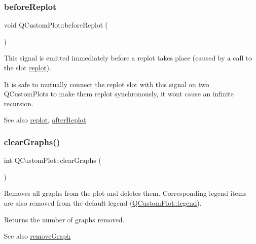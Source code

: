 \subsubsection{\texorpdfstring{before\+Replot}{beforeReplot}}
{\footnotesize\ttfamily void Q\+Custom\+Plot\+::before\+Replot (\begin{DoxyParamCaption}{ }\end{DoxyParamCaption})\hspace{0.3cm}{\ttfamily [signal]}}

This signal is emitted immediately before a replot takes place (caused by a call to the slot \hyperlink{class_q_custom_plot_aa4bfe7d70dbe67e81d877819b75ab9af}{replot}).

It is safe to mutually connect the replot slot with this signal on two Q\+Custom\+Plots to make them replot synchronously, it won\textquotesingle{}t cause an infinite recursion.

\begin{DoxySeeAlso}{See also}
\hyperlink{class_q_custom_plot_aa4bfe7d70dbe67e81d877819b75ab9af}{replot}, \hyperlink{class_q_custom_plot_a6f4fa624af060bc5919c5f266cf426a0}{after\+Replot} 
\end{DoxySeeAlso}
\mbox{\label{class_q_custom_plot_ab0f3abff2d2f7df3668b5836f39207fa}} 
\subsubsection{\texorpdfstring{clear\+Graphs()}{clearGraphs()}}
{\footnotesize\ttfamily int Q\+Custom\+Plot\+::clear\+Graphs (\begin{DoxyParamCaption}{ }\end{DoxyParamCaption})}

Removes all graphs from the plot and deletes them. Corresponding legend items are also removed from the default legend (\hyperlink{class_q_custom_plot_a4eadcd237dc6a09938b68b16877fa6af}{Q\+Custom\+Plot\+::legend}).

Returns the number of graphs removed.

\begin{DoxySeeAlso}{See also}
\hyperlink{class_q_custom_plot_a903561be895fb6528a770d66ac5e6713}{remove\+Graph} 
\end{DoxySeeAlso}
\mbox{\label{class_q_custom_plot_abdfd07d4f0591d0cf967f85013fd3645}} 
